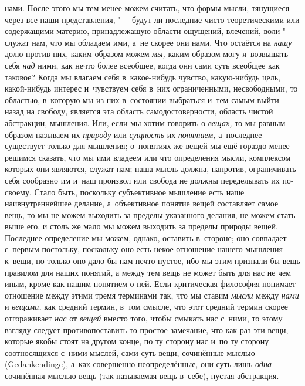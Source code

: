 нами. После этого мы тем менее можем считать, что формы мысли, тянущиеся через
все наши представления, "--- будут ли последние чисто теоретическими или
содержащими материю, принадлежащую области ощущений, влечений, воли "--- служат
нам, что мы обладаем ими, а~не скорее они нами. Что остаётся на {\em нашу} долю
против них, каким образом можем {\em мы,} каким образом могу я~возвышать себя
{\em над} ними, как нечто более всеобщее, когда они сами суть всеобщее как
таковое? Когда мы влагаем себя в~какое-нибудь чувство, какую-нибудь цель,
какой-нибудь интерес и~чувствуем себя в~них ограниченными, несвободными, то
областью, в~которую мы из них в~состоянии выбраться и~тем самым выйти назад на
свободу, является эта область самодостоверности, область чистой абстракции,
мышления. Или, если мы хотим говорить о {\em вещах,} то мы равным образом
называем их {\em природу} или {\em сущность} их {\em понятием,} а~последнее
существует только для мышления; о~понятиях же вещей мы ещё гораздо менее
решимся сказать, что мы ими владеем или что определения мысли, комплексом
которых они являются, служат нам; наша мысль должна, напротив, ограничивать
себя сообразно им и~наш произвол или свобода не должны переделывать их
по-своему. Стало быть, поскольку субъективное мышление есть наше
наивнутреннейшее делание, а~объективное понятие вещей составляет самое вещь, то
мы не можем выходить за пределы указанного делания, не можем стать выше его, и
столь же мало мы можем выходить за пределы природы вещей. Последнее определение
мы можем, однако, оставить в~стороне; оно совпадает с~первым постольку,
поскольку оно есть некое отношение нашего мышления к~вещи, но только оно дало
бы нам нечто пустое, ибо мы этим признали бы вещь правилом для наших понятий, а
между тем вещь не может быть для нас не чем иным, кроме как нашим понятием о
ней. Если критическая философия понимает отношение между этими тремя терминами
так, что мы ставим {\em мысли} между {\em нами} и {\em вещами,} как средний
термин, в~том смысле, что этот средний термин скорее отгораживает {\em нас} от
{\em вещей} вместо того, чтобы смыкать нас с~ними, то этому взгляду следует
противопоставить то простое замечание, что как раз эти вещи, которые якобы
стоят на другом конце, по ту сторону нас и~по ту сторону соотносящихся с~ними
мыслей, сами суть вещи, сочинённые мыслью (Gedank\-end\-inge), а~как совершенно
неопределённые, они суть лишь {\em одна} сочинённая мыслью вещь (так называемая
вещь в~себе), пустая абстракция.

